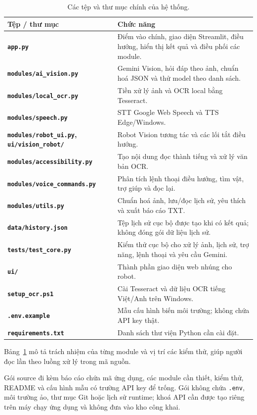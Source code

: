 \begin{table}[H]
\centering
\caption{Các tệp và thư mục chính của hệ thống.}
\label{tab:cautrucsource}
\begin{tabular*}{\textwidth}{@{\extracolsep{\fill}}>{\bfseries\color{daunavy}}p{4.1cm} p{9.0cm}}
\toprule
\rowcolor{gray100}
Tệp / thư mục & Chức năng \\
\midrule
\texttt{app.py} & Điểm vào chính, giao diện Streamlit, điều hướng, hiển thị kết quả và điều phối các module. \\
\texttt{modules/ai\_vision.py} & Gemini Vision, hỏi đáp theo ảnh, chuẩn hoá JSON và thử model theo danh sách. \\
\texttt{modules/local\_ocr.py} & Tiền xử lý ảnh và OCR local bằng Tesseract. \\
\texttt{modules/speech.py} & STT Google Web Speech và TTS Edge/Windows. \\
\texttt{modules/robot\_ui.py}, \texttt{ui/vision\_robot/} & Robot Vision tương tác và các lối tắt điều hướng. \\
\texttt{modules/accessibility.py} & Tạo nội dung đọc thành tiếng và xử lý văn bản OCR. \\
\texttt{modules/voice\_commands.py} & Phân tích lệnh thoại điều hướng, tìm vật, trợ giúp và đọc lại. \\
\texttt{modules/utils.py} & Chuẩn hoá ảnh, lưu/đọc lịch sử, yêu thích và xuất báo cáo TXT. \\
\texttt{data/history.json} & Tệp lịch sử cục bộ được tạo khi có kết quả; không đóng gói dữ liệu lịch sử. \\
\texttt{tests/test\_core.py} & Kiểm thử cục bộ cho xử lý ảnh, lịch sử, trợ năng, lệnh thoại và yêu cầu Gemini. \\
\texttt{ui/} & Thành phần giao diện web nhúng cho robot. \\
\texttt{setup\_ocr.ps1} & Cài Tesseract và dữ liệu OCR tiếng Việt/Anh trên Windows. \\
\texttt{.env.example} & Mẫu cấu hình biến môi trường; không chứa API key thật. \\
\texttt{requirements.txt} & Danh sách thư viện Python cần cài đặt. \\
\bottomrule
\end{tabular*}
\end{table}

Bảng~\ref{tab:cautrucsource} mô tả trách nhiệm của từng module và vị trí các
kiểm thử, giúp người đọc lần theo luồng xử lý trong mã nguồn.

Gói source đi kèm báo cáo chứa mã ứng dụng, các module cần thiết, kiểm thử,
README và cấu hình mẫu có trường API key để trống. Gói không chứa \texttt{.env},
môi trường ảo, thư mục Git hoặc lịch sử runtime; khoá API cần được tạo riêng
trên máy chạy ứng dụng và không đưa vào kho công khai.
